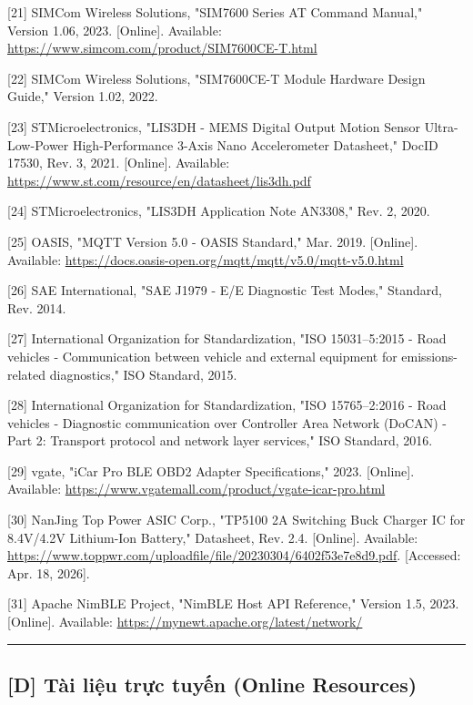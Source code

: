 \documentclass[a4paper]{extarticle}
\begin{document}
{[}21{]} SIMCom Wireless Solutions, "SIM7600 Series AT Command Manual,"
Version 1.06, 2023. {[}Online{]}. Available:
\url{https://www.simcom.com/product/SIM7600CE-T.html}

{[}22{]} SIMCom Wireless Solutions, "SIM7600CE-T Module Hardware Design
Guide," Version 1.02, 2022.

{[}23{]} STMicroelectronics, "LIS3DH - MEMS Digital Output Motion
Sensor Ultra-Low-Power High-Performance 3-Axis
\textquotesingle Nano\textquotesingle{} Accelerometer Datasheet," DocID
17530, Rev. 3, 2021. {[}Online{]}. Available:
\url{https://www.st.com/resource/en/datasheet/lis3dh.pdf}

{[}24{]} STMicroelectronics, "LIS3DH Application Note AN3308," Rev. 2,
2020.

{[}25{]} OASIS, "MQTT Version 5.0 - OASIS Standard," Mar. 2019.
{[}Online{]}. Available:
\url{https://docs.oasis-open.org/mqtt/mqtt/v5.0/mqtt-v5.0.html}

{[}26{]} SAE International, "SAE J1979 - E/E Diagnostic Test Modes,"
Standard, Rev. 2014.

{[}27{]} International Organization for Standardization, "ISO
15031--5:2015 - Road vehicles - Communication between vehicle and
external equipment for emissions-related diagnostics," ISO Standard,
2015.

{[}28{]} International Organization for Standardization, "ISO
15765--2:2016 - Road vehicles - Diagnostic communication over Controller
Area Network (DoCAN) - Part 2: Transport protocol and network layer
services," ISO Standard, 2016.

{[}29{]} vgate, "iCar Pro BLE OBD2 Adapter Specifications," 2023.
{[}Online{]}. Available:
\url{https://www.vgatemall.com/product/vgate-icar-pro.html}

{[}30{]} NanJing Top Power ASIC Corp., "TP5100 2A Switching Buck Charger
IC for 8.4V/4.2V Lithium-Ion Battery," Datasheet, Rev. 2.4. {[}Online{]}. Available:
\url{https://www.toppwr.com/uploadfile/file/20230304/6402f53e7e8d9.pdf}. {[}Accessed: Apr. 18, 2026{]}.

{[}31{]} Apache NimBLE Project, "NimBLE Host API Reference," Version
1.5, 2023. {[}Online{]}. Available:
\url{https://mynewt.apache.org/latest/network/}

\begin{center}\rule{0.5\linewidth}{0.5pt}\end{center}

\subsection{{[}D{]} Tài liệu trực tuyến (Online
Resources)}\label{d-tuxe0i-liux1ec7u-trux1ef1c-tuyux1ebfn-online-resources}
\end{document}
